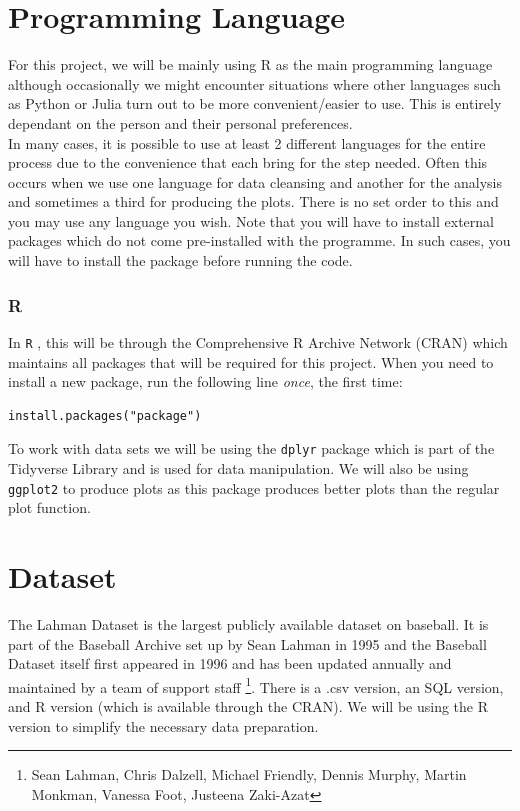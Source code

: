 \documentclass[11pt,a4paper]{report}
\begin{document}
\section{Programming Language}
For this project, we will be mainly using R as the main programming language although occasionally we might encounter situations where other languages such as Python or Julia turn out to be more convenient/easier to use. This is entirely dependant on the person and their personal preferences.\\
In many cases, it is possible to use at least 2 different languages for the entire process due to the convenience that each bring for the step needed. Often this occurs when we use one
language for data cleansing and another for the analysis and sometimes a third for producing the plots. There is no set order to this and you may use any language you wish.
Note that you will have to install external packages which do not come pre-installed with the programme. In such cases, you will have to install the package before running the code.

\subsubsection{R}
In {\color{blue} \texttt{R}} \cite{R}, this will be through the Comprehensive R Archive Network (CRAN) which maintains all packages that will be required for this project. When you need to install a new package, run the following line \textit{once}, the first time:
\begin{verbatim}
install.packages("package")
\end{verbatim}
To work with data sets we will be using the {\color{blue} \texttt{dplyr}} \cite{dplyr} package which is part of the Tidyverse Library and is used for data manipulation. We will also be using {\color{blue} \texttt{ggplot2}} \cite{ggplot} to produce plots as this package produces better plots than the regular plot function.

\section{Dataset}
The Lahman Dataset is the largest publicly available dataset on baseball. It is part of the Baseball Archive set up by Sean Lahman in 1995 and the Baseball Dataset itself first appeared in 1996 and has been updated annually and maintained by a team of support staff \cite{Lahman} \footnote{Sean Lahman, Chris Dalzell, Michael Friendly, Dennis Murphy, Martin Monkman, Vanessa Foot, Justeena Zaki-Azat}. There is a .csv version, an SQL version, and R version (which is available through the CRAN). We will be using the R version to simplify the necessary data preparation.
\end{document}
